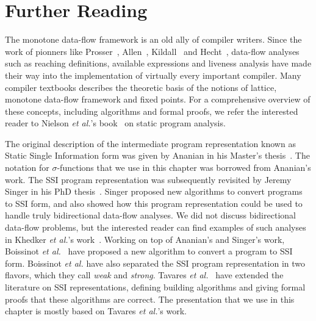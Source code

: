 \section{Further Reading}

The monotone data-flow framework is an old ally of compiler writers.
Since the work of pionners like Prosser~\cite{Prosser59}, Allen~\cite{Allen70,Allen76}, Kildall~\cite{Kildall77} and Hecht~\cite{Hecht77}, data-flow analyses such as reaching definitions, available expressions and liveness analysis have made their way into the implementation of virtually every important compiler.
Many compiler textbooks describes the theoretic basis of the notions of lattice, monotone data-flow framework and fixed points.
For a comprehensive overview of these concepts, including algorithms and formal proofs, we refer the interested reader to Nielson {\em et al.}'s book~\cite{Nielson05} on static program analysis.

The original description of the intermediate program representation known as Static Single Information form was given by Ananian in his Master's thesis~\cite{Ananian99}.
The notation for $\sigma$-functions that we use in this chapter was borrowed from Ananian's work.
The SSI program representation was subsequently revisited by Jeremy Singer in his PhD thesis~\cite{Singer06}.
Singer proposed new algorithms to convert programs to SSI form, and also showed how this program representation could be used to handle truly bidirectional data-flow analyses.
We did not discuss bidirectional data-flow problems, but the interested reader can find examples of such analyses in Khedker {\em et al.}'s work~\cite{Khedker99}.
Working on top of Ananian's and Singer's work, Boissinot {\em et al.}~\cite{BoissinotBDR12} have proposed a new algorithm to convert a program to SSI form.
Boissinot {\em et al.} have also separated the SSI program representation in two flavors, which they call {\em weak} and {\em strong}.
Tavares {\em et al.}~\cite{Tavares11b} have extended the literature on SSI representations, defining building algorithms and giving formal proofs that these algorithms are correct.
The presentation that we use in this chapter is mostly based on Tavares {\em et
al.}'s work.

